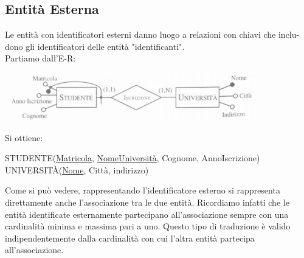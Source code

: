 \documentclass[a4paper,12pt, oneside]{book}
\begin{document}
\subsection{Entità Esterna}
Le entità con identificatori esterni danno luogo a relazioni con chiavi che inclu-
dono gli identificatori delle entità "identificanti".\\
Partiamo dall'E-R:
\begin{center}
\includegraphics[scale=1]{img/erre3.png}
\end{center}
Si ottiene:
\begin{center}
  STUDENTE(\underline{Matricola}, \underline{NomeUniversità}, Cognome, AnnoIscrizione)\\
UNIVERSITÀ(\underline{Nome}, Città, indirizzo)
\end{center}
Come si può vedere, rappresentando l'identificatore esterno si rappresenta
direttamente anche l'associazione tra le due entità. Ricordiamo infatti che le entità
identificate esternamente partecipano all'associazione sempre con una cardinalità
minima e massima pari a uno. Questo tipo di traduzione è valido
indipendentemente dalla cardinalità con cui l'altra entità partecipa all'associazione.
\end{document}
